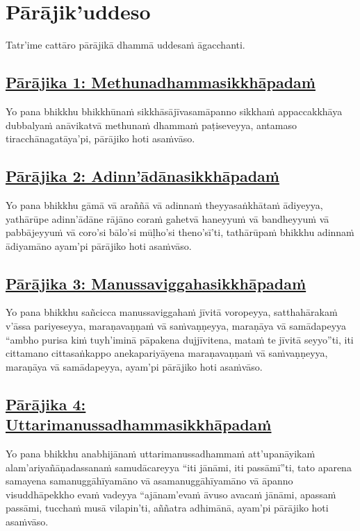 \section{Pārājik'uddeso}
\label{par}

\begin{intro}
  Tatr'ime cattāro pārājikā dhammā uddesaṁ āgacchanti.
\end{intro}

\setsubsecheadstyle{\subsubsectionFmt}
\subsection*{\hyperref[disq1]{Pārājika 1: Methunadhammasikkhāpadaṁ}}
\label{par1}
Yo pana bhikkhu bhikkhūnaṁ sikkhāsājīvasamāpanno sikkhaṁ appaccakkhāya dubbalyaṁ anāvikatvā methunaṁ dhammaṁ paṭiseveyya, antamaso tiracchānagatāya'pi, pārājiko hoti asaṁvāso.

\subsection*{\hyperref[disq2]{Pārājika 2: Adinn'ādānasikkhāpadaṁ}}
\label{par2}
Yo pana bhikkhu gāmā vā araññā vā adinnaṁ theyyasaṅkhātaṁ ādiyeyya, yathārūpe adinn'ādāne rājāno coraṁ gahetvā haneyyuṁ vā bandheyyuṁ vā pabbājeyyuṁ vā coro'si bālo'si mūḷho'si theno'sī'ti, tathārūpaṁ bhikkhu adinnaṁ ādiyamāno ayam'pi pārājiko hoti asaṁvāso.

\subsection*{\hyperref[disq3]{Pārājika 3: Manussaviggahasikkhāpadaṁ}}
\label{par3}
Yo pana bhikkhu sañcicca manussaviggahaṁ jīvitā voropeyya, satthahārakaṁ v'āssa pariyeseyya, maraṇavaṇṇaṁ vā saṁvaṇṇeyya, maraṇāya vā samādapeyya “ambho purisa kiṁ tuyh'iminā pāpakena dujjīvitena, mataṁ te jīvitā seyyo”ti, iti cittamano cittasaṅkappo anekapariyāyena maraṇavaṇṇaṁ vā saṁvaṇṇeyya, maraṇāya vā samādapeyya, ayam'pi pārājiko hoti asaṁvāso.

\subsection*{\hyperref[disq4]{Pārājika 4: Uttarimanussadhammasikkhāpadaṁ}}
\label{par4}
Yo pana bhikkhu anabhijānaṁ uttarimanussadhammaṁ att'upanāyikaṁ alam'ariyañāṇadassanaṁ samudācareyya “iti jānāmi, iti passāmī”ti, tato aparena samayena samanuggāhīyamāno vā asamanuggāhīyamāno vā āpanno visuddhāpekkho evaṁ vadeyya “ajānam'evaṁ āvuso avacaṁ jānāmi, apassaṁ passāmi, tucchaṁ musā vilapin'ti, aññatra adhimānā, ayam'pi pārājiko hoti asaṁvāso.

